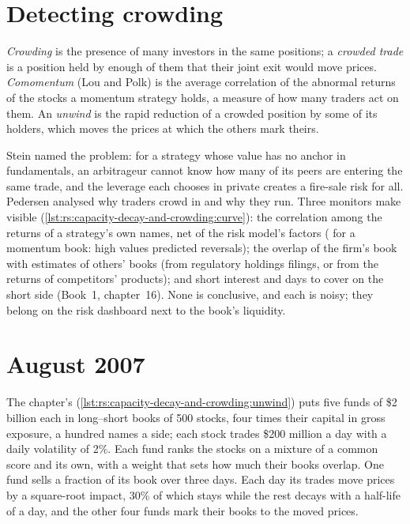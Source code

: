\section{Detecting crowding}

\begin{definition}\label{def:rs:capacity-decay-and-crowding:crowding}
\emph{Crowding} is the presence of many investors in the same positions; a \emph{crowded trade} is a position held by enough
of them that their joint exit would move prices. \emph{Comomentum} (Lou and Polk) is the average correlation of the abnormal returns of the
stocks a momentum strategy holds, a measure of how many traders act on them. An \emph{unwind} is the rapid reduction of a crowded position by some
of its holders, which moves the prices at which the others mark theirs.
\end{definition}

Stein named the problem: for a strategy whose value has no anchor in fundamentals, an arbitrageur cannot know how many of its peers are entering the same trade,
and the leverage each chooses in private creates a fire-sale risk for all. Pedersen analysed why traders crowd in and why they run. Three monitors make 
visible (\cref{lst:rs:capacity-decay-and-crowding:curve}): the correlation among the returns of a strategy's own names, net of the risk model's factors (
for a momentum book: high values predicted reversals); the overlap of the firm's book with estimates of others' books (from regulatory holdings filings, or from
the returns of competitors' products); and short interest and days to cover on the short side (Book~1, chapter~16). None is conclusive, and each is noisy; they
belong on the risk dashboard next to the book's liquidity.

\section{August 2007}

The chapter's  (\cref{lst:rs:capacity-decay-and-crowding:unwind}) puts five funds of \$2 billion each in long--short books of 500 stocks, four times their
capital in gross exposure, a hundred names a side; each stock trades \$200 million a day with a daily volatility of 2\%. Each fund ranks the stocks on a mixture of
a common score and its own, with a weight that sets how much their books overlap. One fund sells a fraction of its book over three days. Each day its trades
move prices by a square-root impact, 30\% of which stays while the rest decays with a half-life of a day, and the other four funds mark their books to the moved
prices.

